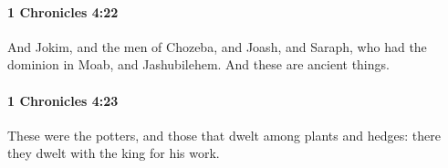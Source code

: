 		\paragraph{1 Chronicles 4:22} %
			\label{1CHRONICLES-4-22}

			And Jokim, and the men of Chozeba, and Joash, and Saraph, who had the dominion in Moab, and Jashubilehem. And these are ancient things.


		\paragraph{1 Chronicles 4:23} %
			\label{1CHRONICLES-4-23}

			These were the potters, and those that dwelt among plants and hedges: there they dwelt with the king for his work.


